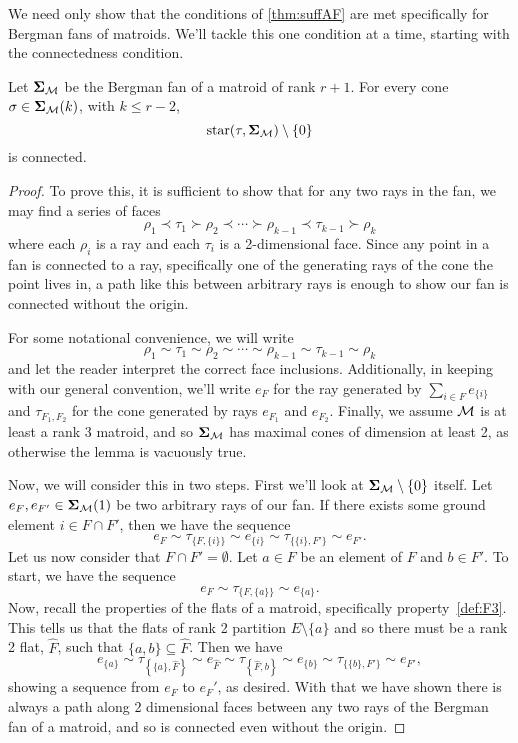 \documentclass[12pt,oneside]{../../sfsuthesis}
\begin{document}
We need only show that the conditions of \th\ref{thm:suffAF} are met specifically for Bergman fans of matroids.
We'll tackle this one condition at a time, starting with the connectedness condition.

\begin{lemma}[Connectedness]\th\label{thm:matroidConnected}
    Let \( {\bm{\Sigma}}_{\mathcal{M}} \) be the Bergman fan of a matroid of rank \( r + 1 \).
    For every cone \( \sigma \in {\bm{\Sigma}}_{\mathcal{M}}(k) \), with \( k \leq r - 2 \),
    \[
        \operatorname{star}(\tau, {\bm{\Sigma}}_{\mathcal{M}}) \setminus \{ 0 \}
    \]
    is connected.
\end{lemma}
\begin{proof}
    To prove this, it is sufficient to show that for any two rays in the fan, we may find a series of faces
    \[
        \rho_1 \prec \tau_1 \succ \rho_2 \prec \cdots \succ \rho_{k-1} \prec \tau_{k-1} \succ \rho_k
    \]
    where each \( \rho_i \) is a ray and each \( \tau_i \) is a 2-dimensional face.
    Since any point in a fan is connected to a ray, specifically one of the generating rays of the cone the point lives in, a path like this between arbitrary rays is enough to show our fan is connected without the origin.

    For some notational convenience, we will write
    \[
        \rho_1 \sim \tau_1 \sim \rho_2 \sim \cdots \sim \rho_{k-1} \sim \tau_{k-1} \sim \rho_k
    \]
    and let the reader interpret the correct face inclusions.
    Additionally, in keeping with our general convention, we'll write \( e_F \) for the ray generated by \( \sum_{i \in F} e_{\{i\}} \) and \( \tau_{F_1, F_2} \) for the cone generated by rays \( e_{F_1} \) and \( e_{F_2} \).
    Finally, we assume \( \mathcal{M} \) is at least a rank 3 matroid, and so \( {\bm{\Sigma}}_{\mathcal{M}} \) has maximal cones of dimension at least 2, as otherwise the lemma is vacuously true.

    Now, we will consider this in two steps.
    First we'll look at \( {\bm{\Sigma}}_{\mathcal{M}} \setminus \{ 0 \} \) itself.
    Let \( e_{F}, e_{F'} \in {\bm{\Sigma}}_{\mathcal{M}}(1) \) be two arbitrary rays of our fan.
    If there exists some ground element \( i \in F \cap F' \), then we have the sequence
    \[
        e_F \sim \tau_{\{F, \{i\}\}} \sim e_{\{i\}} \sim \tau_{\{\{i\}, F'\}} \sim e_{F'}.
    \]
    Let us now consider that \( F \cap F' = \emptyset \).
    Let \( a \in F \) be an element of \( F \) and \( b \in F' \).
    To start, we have the sequence
    \[
        e_F \sim \tau_{\{F, \{a\}\}} \sim e_{\{a\}}.
    \]
    Now, recall the properties of the flats of a matroid, specifically property~\ref{def:F3}.
    This tells us that the flats of rank 2 partition \( E \setminus \{a\} \) and so there must be a rank 2 flat, \( \widehat{F} \), such that \( \{ a, b \} \subseteq \widehat{F} \).
    Then we have
    \[
        e_{\{a\}} \sim \tau_{\left\{\{a\}, \widehat{F}\right\}} \sim e_{\widehat{F}} \sim \tau_{\left\{\widehat{F}, b\right\}} \sim e_{\{b\}} \sim \tau_{\{\{b\}, F'\}} \sim e_{F'},
    \]
    showing a sequence from \( e_F \) to \( e_F' \), as desired.
    With that we have shown there is always a path along 2 dimensional faces between any two rays of the Bergman fan of a matroid, and so is connected even without the origin.


\end{proof}
\end{document}
